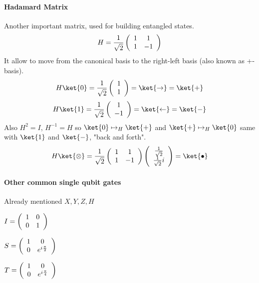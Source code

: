 \documentclass[10pt]{report}
\begin{document}
\paragraph{Hadamard Matrix} Another important matrix, used for building entangled states.
$$H=\frac{1}{\sqrt{2}}\left(\begin{array}{c c}
1&1\\1&-1
\end{array}\right)$$
It allow to move from the canonical basis to the right-left basis (also known as +- basis).
$$H\ket{0} = \frac{1}{\sqrt{2}}\left(\begin{array}{c}
1\\1
\end{array}\right) = \ket{\rightarrow} = \ket{+}$$
$$H\ket{1} = \frac{1}{\sqrt{2}}\left(\begin{array}{c}
1\\-1
\end{array}\right) = \ket{\leftarrow} = \ket{-}$$
Also $H^2 = I$, $H^{-1} = H$ so $\ket{0}\mapsto_H \ket{+}$ and $\ket{+}\mapsto_H \ket{0}$ same with $\ket{1}$ and $\ket{-}$, "back and forth".\\
$$H\ket{\otimes} = \frac{1}{\sqrt{2}}\left(\begin{array}{c c}
1&1\\1&-1
\end{array}\right)\left(\begin{array}{c}
\frac{1}{\sqrt{2}}\\\frac{1}{\sqrt{2}}i
\end{array}\right) = \ket{\bullet}$$
\paragraph{Other common single qubit gates} Already mentioned $X,Y,Z,H$\begin{list}{}{}
	\item $I = \left(\begin{array}{c c}
	1&0\\0&1
	\end{array}\right)$
	\item $S = \left(\begin{array}{c c}
	1&0\\0&e^{i\frac{\pi}{2}}
	\end{array}\right)$
	\item $T = \left(\begin{array}{c c}
	1&0\\0&e^{i\frac{\pi}{4}}
	\end{array}\right)$
\end{list}
\end{document}
